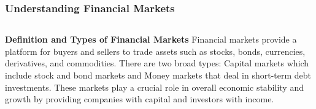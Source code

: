 \documentclass[5pt]{beamer}
\begin{document}
\begin{frame}
\frametitle{Understanding Financial Markets}
\begin{columns}
\begin{column}{0.7\textwidth}
\begin{block}{\textbf{Definition and Types of Financial Markets}}
Financial markets provide a platform for buyers and sellers to trade assets such as stocks, bonds, currencies, derivatives, and commodities. There are two broad types: Capital markets which include stock and bond markets and Money markets that deal in short-term debt investments. These markets play a crucial role in overall economic stability and growth by providing companies with capital and investors with income.
\end{block}
\end{column}
\end{columns}
\end{frame}
\end{document}
